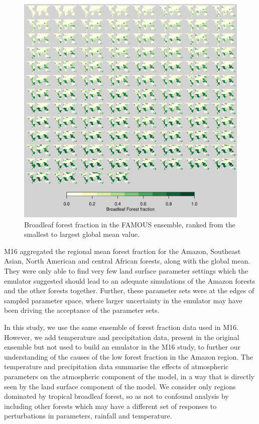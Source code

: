\documentclass[gmd, manuscript]{copernicus}
\begin{document}
\begin{figure}[t]
\includegraphics[width=12cm]{../graphics/tropics_maps_yg.pdf}
\caption{Broadleaf forest fraction in the FAMOUS ensemble, ranked from the smallest to largest global mean value.}
\label{fig:tropics_maps_yg}
\end{figure}


M16 aggregated the regional mean forest fraction for the Amazon, Southeast Asian, North American and central African forests, along with the global mean. They were only able to find very few land surface parameter settings which the emulator suggested should lead to an adequate simulations of the Amazon forests and the other forests together. Further, these parameter sets were at the edges of sampled parameter space, where larger uncertainty in the emulator may have been driving the acceptance of the parameter sets. 
 
In this study, we use the same ensemble of forest fraction data used in M16. However, we add temperature and precipitation data, present in the original ensemble but not used to build an emulator in the M16 study, to further our understanding of the causes of the low forest fraction in the Amazon region. The temperature and precipitation data summarise the effects of atmospheric parameters on the atmospheric component of the model, in a way that is directly seen by the land surface component of the model. We consider only regions dominated by tropical broadleaf forest, so as not to confound analysis by including other forests which may have a different set of responses to perturbations in parameters, rainfall and temperature.
\end{document}
